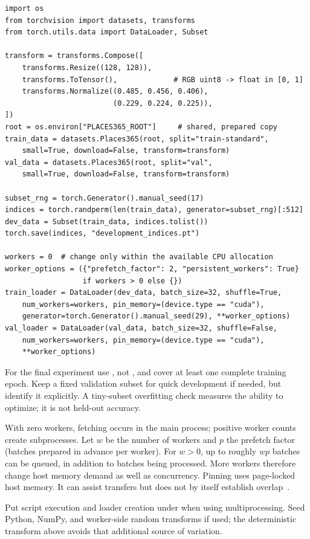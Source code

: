 \documentclass[11pt,a4paper,oneside]{report}
\newcommand{\code}[1]{\texttt{\detokenize{#1}}}
\begin{document}
\begin{lstlisting}[style=python]
import os
from torchvision import datasets, transforms
from torch.utils.data import DataLoader, Subset

transform = transforms.Compose([
    transforms.Resize((128, 128)),
    transforms.ToTensor(),             # RGB uint8 -> float in [0, 1]
    transforms.Normalize((0.485, 0.456, 0.406),
                         (0.229, 0.224, 0.225)),
])
root = os.environ["PLACES365_ROOT"]     # shared, prepared copy
train_data = datasets.Places365(root, split="train-standard",
    small=True, download=False, transform=transform)
val_data = datasets.Places365(root, split="val",
    small=True, download=False, transform=transform)

subset_rng = torch.Generator().manual_seed(17)
indices = torch.randperm(len(train_data), generator=subset_rng)[:512]
dev_data = Subset(train_data, indices.tolist())
torch.save(indices, "development_indices.pt")

workers = 0  # change only within the available CPU allocation
worker_options = ({"prefetch_factor": 2, "persistent_workers": True}
                  if workers > 0 else {})
train_loader = DataLoader(dev_data, batch_size=32, shuffle=True,
    num_workers=workers, pin_memory=(device.type == "cuda"),
    generator=torch.Generator().manual_seed(29), **worker_options)
val_loader = DataLoader(val_data, batch_size=32, shuffle=False,
    num_workers=workers, pin_memory=(device.type == "cuda"),
    **worker_options)
\end{lstlisting}

For the final experiment use \code{train_data}, not \code{dev_data}, and cover
at least one complete training epoch. Keep a fixed validation subset for quick
development if needed, but identify it explicitly. A tiny-subset overfitting
check measures the ability to optimize; it is not held-out accuracy.

With zero workers, fetching occurs in the main process; positive worker counts
create subprocesses. Let $w$ be the number of workers and $p$ the prefetch
factor (batches prepared in advance per worker). For $w>0$, up to roughly
$wp$ batches can be queued, in addition to batches being processed. More
workers therefore change host memory demand as well as concurrency. Pinning
uses page-locked host memory. It can assist transfers but does not by itself
establish overlap~\cite{dataloader}.

Put script execution and loader creation under
\code{if __name__ == "__main__":} when using multiprocessing. Seed Python,
NumPy, and worker-side random transforms if used; the deterministic transform
above avoids that additional source of variation.
\end{document}
